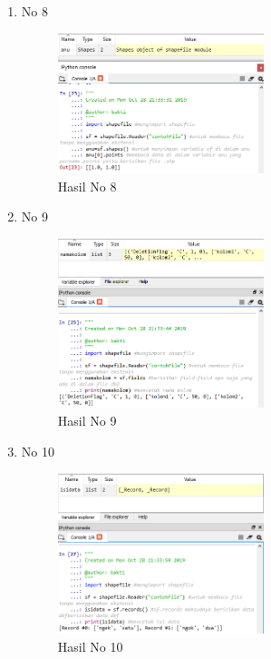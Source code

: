 \begin{enumerate}
	\item No 8
	
	\begin{figure}[H]
		\includegraphics[width=6cm]{figures/Tugas3/1174083/pictureNo8.png}
		\centering
		\caption{Hasil No 8}
	\end{figure}
	
	\item No 9
	
	\begin{figure}[H]
		\includegraphics[width=6cm]{figures/Tugas3/1174083/pictureNo9.png}
		\centering
		\caption{Hasil No 9}
	\end{figure}
	
	\item No 10
	
	\begin{figure}[H]
		\includegraphics[width=6cm]{figures/Tugas3/1174083/pictureNo10.png}
		\centering
		\caption{Hasil No 10}
	\end{figure}
	

\end{enumerate}
